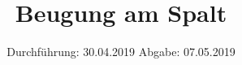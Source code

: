 

\subject{Nr. 406}
\title{Beugung am Spalt}
\date{%
  Durchführung: 30.04.2019
  \hspace{3em}
  Abgabe: 07.05.2019
}



\maketitle
\thispagestyle{empty}
\tableofcontents
\newpage






\printbibliography{}


